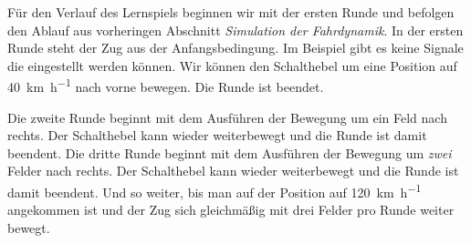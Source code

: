 \documentclass[
    nexus,      %
    10pt,        %
    oneside,
    draft=true,
    green,
]{tubsbook} %
\begin{document}
  Für den Verlauf des Lernspiels beginnen wir mit der ersten Runde und befolgen den Ablauf aus vorheringen Abschnitt \emph{Simulation der Fahrdynamik}.
  In der ersten Runde steht der Zug aus der Anfangsbedingung. Im Beispiel gibt es keine Signale die eingestellt werden können.
  Wir können den Schalthebel um eine Position auf \SI{40}{\kilo\metre\per\hour} nach vorne bewegen. Die Runde ist beendet.

  Die zweite Runde beginnt mit dem Ausführen der Bewegung um ein Feld nach rechts.
  Der Schalthebel kann wieder weiterbewegt und die Runde ist damit beendent.
  Die dritte Runde beginnt mit dem Ausführen der Bewegung um \emph{zwei} Felder nach rechts.
  Der Schalthebel kann wieder weiterbewegt und die Runde ist damit beendent.
  Und so weiter, bis man auf der Position auf \SI{120}{\kilo\metre\per\hour} angekommen ist und der Zug sich gleichmäßig mit drei Felder pro Runde weiter bewegt.\\[0.5cm]
\end{document}
